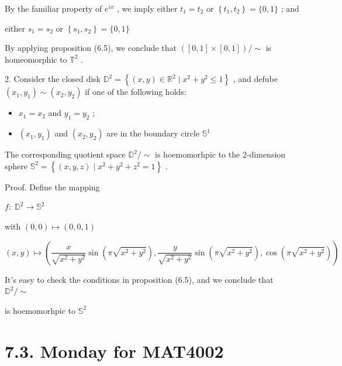 By the familiar property of \({e}^{ix}\) , we imply either \({t}_{1} = {t}_{2}\) or \(\left\{  {{t}_{1},{t}_{2}}\right\}   = \{ 0,1\}\) ; and

either \({s}_{1} = {s}_{2}\) or \(\left\{  {{s}_{1},{s}_{2}}\right\}   = \{ 0,1\}\)

By applying proposition (6.5), we conclude that \(\left( {\left\lbrack  {0,1}\right\rbrack   \times  \left\lbrack  {0,1}\right\rbrack  }\right) / \sim\) is homeomorphic to \({\mathbb{T}}^{2}\) .

2. Consider the closed disk \({\mathbb{D}}^{2} = \left\{  {\left( {x,y}\right)  \in  {\mathbb{R}}^{2} \mid  {x}^{2} + {y}^{2} \leq  1}\right\}\) , and defube \(\left( {{x}_{1},{y}_{1}}\right)  \sim  \left( {{x}_{2},{y}_{2}}\right)\) if one of the following holds:

\begin{itemize}
\item \({x}_{1} = {x}_{2}\) and \({y}_{1} = {y}_{2}\) ;
\end{itemize}

\begin{itemize}
\item \(\left( {{x}_{1},{y}_{1}}\right)\) and \(\left( {{x}_{2},{y}_{2}}\right)\) are in the boundary circle \({\mathbb{S}}^{1}\)
\end{itemize}

The corresponding quotient space \({\mathbb{D}}^{2}/ \sim\) is hoemomorhpic to the 2-dimension sphere \({\mathbb{S}}^{2} = \left\{  {\left( {x,y,z}\right)  \mid  {x}^{2} + {y}^{2} + {z}^{2} = 1}\right\}\) .

Proof. Define the mapping

\(f : \;{\mathbb{D}}^{2} \rightarrow  {\mathbb{S}}^{2}\)

with \(\left( {0,0}\right)  \mapsto  \left( {0,0,1}\right)\)

\[
\left( {x,y}\right)  \mapsto  \left( {\frac{x}{\sqrt{{x}^{2} + {y}^{2}}}\sin \left( {\pi \sqrt{{x}^{2} + {y}^{2}}}\right) ,\frac{y}{\sqrt{{x}^{2} + {y}^{2}}}\sin \left( {\pi \sqrt{{x}^{2} + {y}^{2}}}\right) ,\cos \left( {\pi \sqrt{{x}^{2} + {y}^{2}}}\right) }\right)
\]

It’s easy to check the conditions in proposition (6.5), and we conclude that \({\mathbb{D}}^{2}/ \sim\)

is hoemomorhpic to \({\mathbb{S}}^{2}\)

\section*{7.3. Monday for MAT4002}

